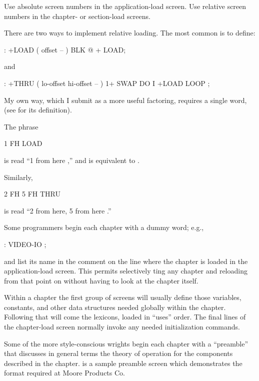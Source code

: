 %
\begin{tip}
Use absolute screen numbers in the application-load screen.  Use
relative screen numbers in the chapter- or section-load screens.
\end{tip}
There are two ways to implement relative loading.
The most common is to define:
\begin{Code}
: +LOAD  ( offset -- )  BLK @ +  LOAD;
\end{Code}
and
\begin{Code}
: +THRU  ( lo-offset hi-offset -- )
     1+ SWAP DO  I +LOAD  LOOP ;
\end{Code}
My own way, which I submit as a more useful factoring, requires a
single word,  (see  for its definition).

The phrase
\begin{Code}
1 FH LOAD
\end{Code}
is read ``1 from here ,'' and is equivalent
to .

Similarly,
\begin{Code}
2 FH   5 FH THRU
\end{Code}
is read ``2 from here, 5 from here .''

Some programmers begin each chapter with a dummy word; e.g.,
\begin{Code}
: VIDEO-IO ;
\end{Code}
and list its name in the comment on the line where the chapter is
loaded in the application-load screen.  This permits selectively
ting any chapter and reloading from that point on
without having to look at the chapter itself.

Within a chapter the first group of screens will usually define those
variables, constants, and other data structures needed globally within
the chapter.  Following that will come the lexicons, loaded in
``uses'' order.  The final lines of the chapter-load screen normally
invoke any needed initialization commands.

%
Some of the more style-conscious \Forth{}wrights begin each chapter
with a ``preamble'' that discusses in general terms the theory of
operation for the components described in the chapter.  
is a sample preamble screen which demonstrates the format required at
Moore Products Co.

